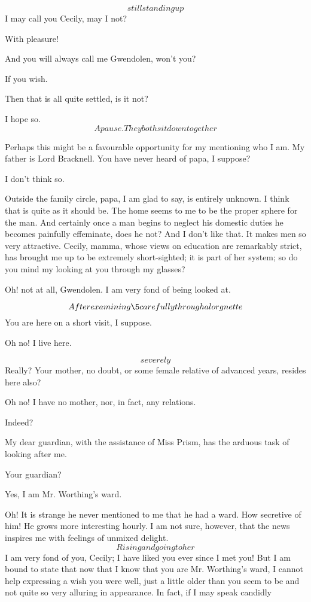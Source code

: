 \documentclass{book}
\begin{document}
\4  \[still standing up\]  I may call you Cecily, may I not?

\5  With pleasure!

\4  And you will always call me Gwendolen, won't you?

\5  If you wish.

\4  Then that is all quite settled, is it not?

\5  I hope so.  \[A pause.  They both sit down together\]

\4  Perhaps this might be a favourable opportunity for my
mentioning who I am.  My father is Lord Bracknell.  You have never
heard of papa, I suppose?

\5  I don't think so.

\4  Outside the family circle, papa, I am glad to say, is
entirely unknown.  I think that is quite as it should be.  The home
seems to me to be the proper sphere for the man.  And certainly
once a man begins to neglect his domestic duties he becomes
painfully effeminate, does he not?  And I don't like that.  It
makes men so very attractive.  Cecily, mamma, whose views on
education are remarkably strict, has brought me up to be extremely
short-sighted; it is part of her system; so do you mind my looking
at you through my glasses?

\5  Oh! not at all, Gwendolen.  I am very fond of being looked
at.

\4  \[After examining \5 carefully through a lorgnette\]\break
You are here on a short visit, I suppose.

\5  Oh no!  I live here.

\4  \[severely\]  Really?  Your mother, no doubt, or some
female relative of advanced years, resides here also?

\5  Oh no!  I have no mother, nor, in fact, any relations.

\4  Indeed?

\5  My dear guardian, with the assistance of Miss Prism, has
the arduous task of looking after me.

\4  Your guardian?

\5  Yes, I am Mr. Worthing's ward.

\4  Oh!  It is strange he never mentioned to me that he had
a ward.  How secretive of him!  He grows more interesting hourly.
I am not sure, however, that the news inspires me with feelings of
unmixed delight.  \[Rising and going to her\]  I am very fond of
you, Cecily; I have liked you ever since I met you!  But I am bound
to state that now that I know that you are Mr. Worthing's ward, I
cannot help expressing a wish you were \textemdash well, just a little older
than you seem to be \textemdash and not quite so very alluring in appearance.
In fact, if I may speak candidly \textemdash
\end{document}
